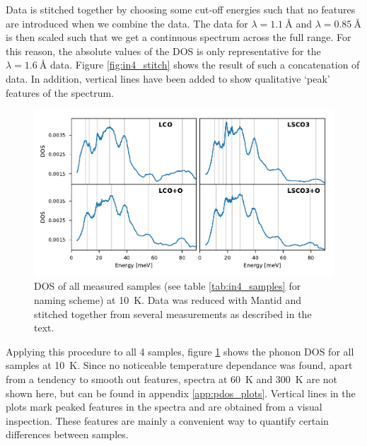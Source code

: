 Data is stitched together by choosing some cut-off energies such that no features are introduced when we combine the data. The data for $\lambda = \SI{1.1}{\angstrom}$ and $\lambda = \SI{0.85}{\angstrom}$ is then scaled such that we get a continuous spectrum across the full range. For this reason, the absolute values of the DOS is only representative for the $\lambda = \SI{1.6}{\angstrom}$ data. Figure \ref{fig:in4_stitch} shows the result of such a concatenation of data. In addition, vertical lines have been added to show qualitative `peak' features of the spectrum.

\begin{figure}
    \centering
    \includegraphics[width=\textwidth]{fig/gdos/in4_10K.pdf}
    \caption[gDOS at \SI{10}{\kelvin}]{DOS of all measured samples (see table \ref{tab:in4_samples} for naming scheme) at \SI{10}{\kelvin}. Data was reduced with Mantid and stitched together from several measurements as described in the text.}
    \label{fig:gdos_10k}
\end{figure}

Applying this procedure to all 4 samples, figure \ref{fig:gdos_10k} shows the phonon DOS for all samples at \SI{10}{\kelvin}. Since no noticeable temperature dependance was found, apart from a tendency to smooth out features, spectra at \SI{60}{\kelvin} and \SI{300}{\kelvin} are not shown here, but can be found in appendix \ref{app:pdos_plots}. Vertical lines in the plots mark peaked features in the spectra and are obtained from a visual inspection. These features are mainly a convenient way to quantify certain differences between samples.

